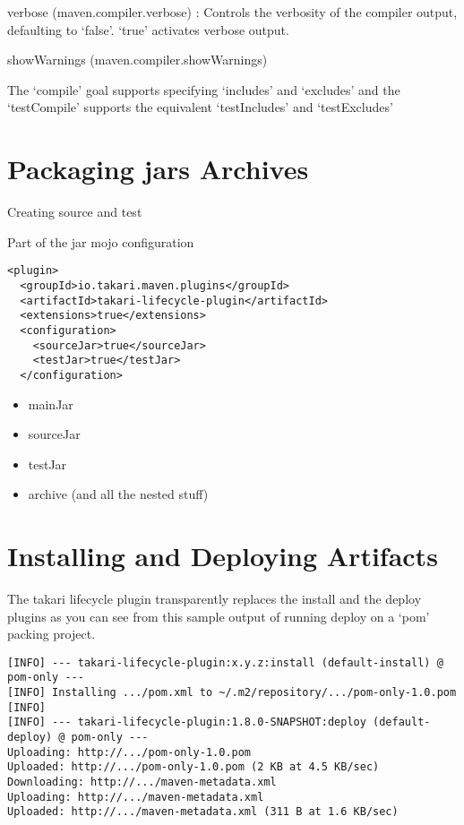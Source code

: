\documentclass[a4paper]{book}
\begin{document}
verbose (maven.compiler.verbose) : Controls the verbosity of the compiler output, defaulting to `false'. `true' activates verbose output.

showWarnings (maven.compiler.showWarnings)

The `compile' goal supports specifying `includes' and `excludes' and the `testCompile' supports the equivalent `testIncludes' and `testExcludes'

\section{Packaging jars Archives}\label{packaging-jars-archives}

Creating source and test

Part of the jar mojo configuration

\begin{shaded}\begin{verbatim}
<plugin>
  <groupId>io.takari.maven.plugins</groupId>
  <artifactId>takari-lifecycle-plugin</artifactId>
  <extensions>true</extensions>
  <configuration>
    <sourceJar>true</sourceJar>
    <testJar>true</testJar>
  </configuration>
\end{verbatim}\end{shaded}

\begin{itemize}
\itemsep1pt\parskip0pt
\item
  mainJar
\item
  sourceJar
\item
  testJar
\item
  archive (and all the nested stuff)
\end{itemize}

\section{Installing and Deploying Artifacts}\label{installing-and-deploying-artifacts}

The takari lifecycle plugin transparently replaces the install and the deploy plugins as you can see from this sample output of running deploy on a `pom' packing project.

\begin{shaded}\begin{verbatim}
[INFO] --- takari-lifecycle-plugin:x.y.z:install (default-install) @ pom-only ---
[INFO] Installing .../pom.xml to ~/.m2/repository/.../pom-only-1.0.pom
[INFO]
[INFO] --- takari-lifecycle-plugin:1.8.0-SNAPSHOT:deploy (default-deploy) @ pom-only ---
Uploading: http://.../pom-only-1.0.pom
Uploaded: http://.../pom-only-1.0.pom (2 KB at 4.5 KB/sec)
Downloading: http://.../maven-metadata.xml
Uploading: http://.../maven-metadata.xml
Uploaded: http://.../maven-metadata.xml (311 B at 1.6 KB/sec)
\end{verbatim}\end{shaded}
\end{document}
